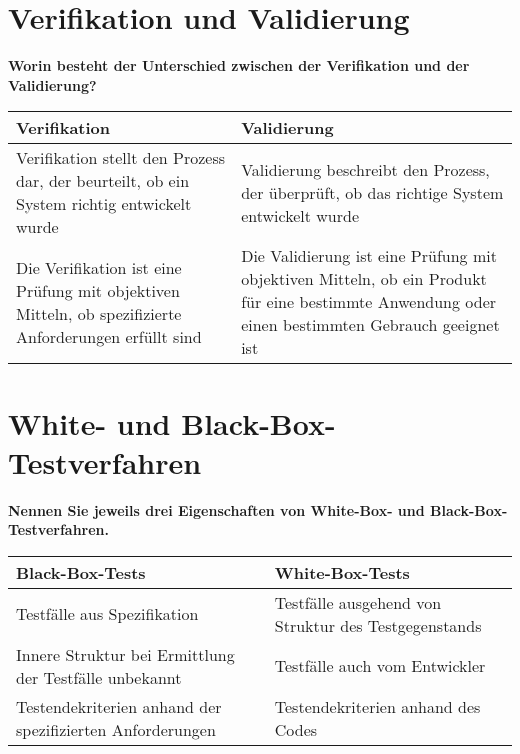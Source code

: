 \section{Verifikation und Validierung}
\textbf{Worin besteht der Unterschied zwischen der Verifikation und der Validierung?}
\begin{table}[H]
    \centering
    \begin{tabular}{p{.45\linewidth}p{.45\linewidth}}
        \toprule
        Verifikation                                                                                          & Validierung                                                                                                                                      \\
        \midrule
        Verifikation stellt den Prozess dar, der beurteilt, ob ein System richtig entwickelt wurde            & Validierung beschreibt den Prozess, der überprüft, ob das richtige System entwickelt wurde                                                       \\
        Die Verifikation ist eine Prüfung mit objektiven Mitteln, ob spezifizierte Anforderungen erfüllt sind & Die Validierung ist eine Prüfung mit objektiven Mitteln, ob ein Produkt für eine bestimmte Anwendung oder einen bestimmten Gebrauch geeignet ist \\
        \bottomrule
    \end{tabular}
\end{table}

\section{White- und Black-Box-Testverfahren}
\textbf{Nennen Sie jeweils drei Eigenschaften von White-Box- und Black-Box-Testverfahren.}
\begin{table}[H]
    \centering
    \begin{tabular}{p{.45\linewidth}p{.45\linewidth}}
        \toprule
        Black-Box-Tests                                          & White-Box-Tests                                      \\
        \midrule
        Testfälle aus Spezifikation                              & Testfälle ausgehend von Struktur des Testgegenstands \\
        Innere Struktur bei Ermittlung der Testfälle unbekannt   & Testfälle auch vom Entwickler                        \\
        Testendekriterien anhand der spezifizierten Anforderungen & Testendekriterien anhand des Codes                    \\
        \bottomrule
    \end{tabular}
\end{table}





